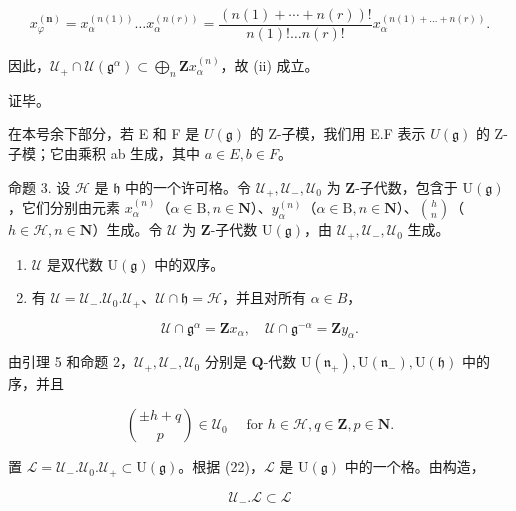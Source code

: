 \[
x _ {\varphi} ^ {(\mathbf {n})} = x _ {\alpha} ^ {(n (1))} \dots x _ {\alpha} ^ {(n (r))} = \frac {(n (1) + \cdots + n (r)) !}{n (1) ! \dots n (r) !} x _ {\alpha} ^ {(n (1) + \dots + n (r))}.
\]

因此，\(\mathcal{U}_{+} \cap \mathcal{U}(\mathfrak{g}^{\alpha}) \subset \bigoplus_{n} \mathbf{Z}x_{\alpha}^{(n)}\)，故 (ii) 成立。

证毕。

在本号余下部分，若 E 和 F 是 \(U(\mathfrak{g})\) 的 Z-子模，我们用 E.F 表示 \(U(\mathfrak{g})\) 的 Z-子模；它由乘积 ab 生成，其中 \(a \in E, b \in F\)。

命题 3. 设 \(\mathcal{H}\) 是 \(\mathfrak{h}\) 中的一个许可格。令 \(\mathcal{U}_{+},\mathcal{U}_{-},\mathcal{U}_{0}\) 为 \(\mathbf{Z}\)-子代数，包含于 \(\mathrm{U}(\mathfrak{g})\)，它们分别由元素 \(x_{\alpha}^{(n)}\)（\(\alpha \in \mathrm{B}, n \in \mathbf{N}\)）、\(y_{\alpha}^{(n)}\)（\(\alpha \in \mathrm{B}, n \in \mathbf{N}\)）、\(\binom{h}{n}\)（\(h \in \mathcal{H}, n \in \mathbf{N}\)）生成。令 \(\mathcal{U}\) 为 \(\mathbf{Z}\)-子代数 \(\mathrm{U}(\mathfrak{g})\)，由 \(\mathcal{U}_{+},\mathcal{U}_{-},\mathcal{U}_{0}\) 生成。

\begin{enumerate}
\def\labelenumi{(\roman{enumi})}
\item
  \(\mathcal{U}\) 是双代数 \(\mathrm{U}(\mathfrak{g})\) 中的双序。
\item
  有 \(\mathcal{U} = \mathcal{U}_{-}. \mathcal{U}_{0}. \mathcal{U}_{+}\)、\(\mathcal{U} \cap \mathfrak{h} = \mathcal{H}\)，并且对所有 \(\alpha \in B\)，
\end{enumerate}

\[
\mathcal {U} \cap \mathfrak {g} ^ {\alpha} = \mathbf {Z} x _ {\alpha}, \quad \mathcal {U} \cap \mathfrak {g} ^ {- \alpha} = \mathbf {Z} y _ {\alpha}.
\]

由引理 5 和命题 2，\(\mathcal{U}_{+},\mathcal{U}_{-},\mathcal{U}_{0}\) 分别是 \(\mathbf{Q}\)-代数 \(\mathrm{U}(\mathfrak{n}_{+}),\mathrm{U}(\mathfrak{n}_{-}),\mathrm{U}(\mathfrak{h})\) 中的序，并且

\[
\binom{\pm h + q}{p} \in \mathcal {U} _ {0} \quad \text { for } h \in \mathcal {H}, q \in \mathbf {Z}, p \in \mathbf {N}.\tag{23}
\]

置 \(\mathcal{L} = \mathcal{U}_{-}. \mathcal{U}_{0}. \mathcal{U}_{+} \subset \mathrm{U}(\mathfrak{g})\)。根据 (22)，\(\mathcal{L}\) 是 \(\mathrm{U}(\mathfrak{g})\) 中的一个格。由构造，

\[
\mathcal {U} _ {-}. \mathcal {L} \subset \mathcal {L}\tag{24}
\]

